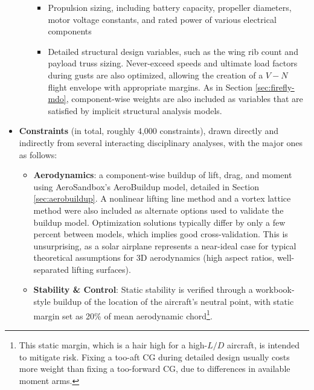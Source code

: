 \begin{example}
\begin{itemize}
\begin{itemize}
\begin{itemize}
                \item Propulsion sizing, including battery capacity, propeller diameters, motor voltage constants, and rated power of various electrical components

                \item Detailed structural design variables, such as the wing rib count and payload truss sizing. Never-exceed speeds and ultimate load factors during gusts are also optimized, allowing the creation of a $V-N$ flight envelope with appropriate margins. As in Section \ref{sec:firefly-mdo}, component-wise weights are also included as variables that are satisfied by implicit structural analysis models.
            \end{itemize}
        \end{itemize}

        \item \textbf{Constraints} (in total, roughly 4,000 constraints), drawn directly and indirectly from several interacting disciplinary analyses, with the major ones as follows:
        \begin{itemize}

            \item \textbf{Aerodynamics}: a component-wise buildup of lift, drag, and moment using AeroSandbox's AeroBuildup model, detailed in Section \ref{sec:aerobuildup}. A nonlinear lifting line method and a vortex lattice method were also included as alternate options used to validate the buildup model. Optimization solutions typically differ by only a few percent between models, which implies good cross-validation. This is unsurprising, as a solar airplane represents a near-ideal case for typical theoretical assumptions for 3D aerodynamics (high aspect ratios, well-separated lifting surfaces).

            \item \textbf{Stability \& Control}: Static stability is verified through a workbook-style buildup of the location of the aircraft's neutral point, with static margin set as 20\% of mean aerodynamic chord\footnote{This static margin, which is a hair high for a high-$L/D$ aircraft, is intended to mitigate risk. Fixing a too-aft CG during detailed design usually costs more weight than fixing a too-forward CG, due to differences in available moment arms.}.


\end{itemize}
\end{itemize}
\end{example}
